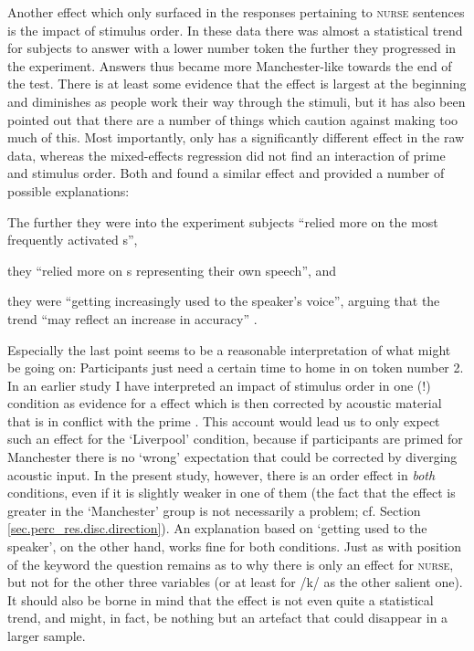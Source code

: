 Another effect which only surfaced in the responses pertaining to \textsc{nurse} sentences is the impact of stimulus order.
In these data there was almost a statistical trend for subjects to answer with a lower number token the further they progressed in the experiment.
Answers thus became more Manchester-like towards the end of the test.
There is at least some evidence that the  effect is largest at the beginning and diminishes as people work their way through the stimuli, but it has also been pointed out that there are a number of things which caution against making too much of this.
Most importantly,  only has a significantly different effect in the raw data, whereas the mixed-effects regression did not find an interaction of prime and stimulus order.
Both \textcite{hayetal2006a} and \textcite{haydrager2010} found a similar effect and provided a number of possible explanations:
	\begin{inparaenum}[(1)]
		\item The further they were into the experiment subjects ``relied more on the most frequently activated s'',
		\item they ``relied more on s representing their own speech'', and
		\item they were ``getting increasingly used to the speaker's voice'', arguing that the trend ``may reflect an increase in accuracy'' \parencite[881--882]{haydrager2010}.
	\end{inparaenum}

Especially the last point seems to be a reasonable interpretation of what might be going on: Participants just need a certain time to home in on token number 2.
In an earlier study I have interpreted an impact of stimulus order in one (!) condition as evidence for a  effect which is then corrected by acoustic material that is in conflict with the prime \parencite{juskanma}.
This account would lead us to only expect such an effect for the `Liverpool' condition, because if participants are primed for Manchester there is no `wrong' expectation that could be corrected by diverging acoustic input.
In the present study, however, there is an order effect in \emph{both} conditions, even if it is slightly weaker in one of them (the fact that the effect is greater in the `Manchester' group is not necessarily a problem; cf. Section \ref{sec.perc_res.disc.direction}).
An explanation based on `getting used to the speaker', on the other hand, works fine for both conditions.
Just as with position of the keyword the question remains as to why there is only an effect for \textsc{nurse}, but not for the other three variables (or at least for /k/ as the other salient one).
It should also be borne in mind that the effect is not even quite a statistical trend, and might, in fact, be nothing but an artefact that could disappear in a larger sample.

